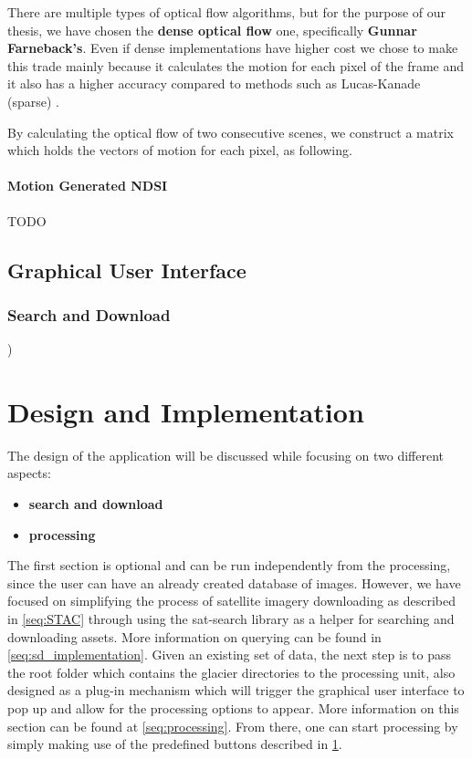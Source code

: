 \documentclass[11pt, a4paper]{report}
\begin{document}
	There are multiple types of optical flow algorithms, but for the purpose of our thesis, we have chosen the \textbf{dense optical flow} one, specifically \textbf{Gunnar Farneback's}. Even if dense implementations have higher cost we chose to make this trade mainly because it calculates the motion for each pixel of the frame and it also has a higher accuracy \cite{orb} compared to methods such as Lucas-Kanade (sparse) \cite{lukas}.
	
	By calculating the optical flow of two consecutive scenes, we construct a matrix which holds the vectors of motion for each pixel, as following.

	\subsubsection{Motion Generated NDSI}
	\label{seq:motion_generated_gui}
	TODO
	\section{Graphical User Interface}
	\label{seq:gui}
	\subsection{Search and Download}
	\label{seq:search_download})

	\chapter{Design and Implementation}
	\label{cha:design_and_implementation}
	
	The design of the application will be discussed while focusing on two different aspects:
	\begin{itemize}
		\item \textbf{search and download}
		\item \textbf{processing}
	\end{itemize}
	The first section is optional and can be run independently from the processing, since the user can have an already created database of images. However, we have focused on simplifying the process of satellite imagery downloading as described in \ref{seq:STAC} through using the sat-search library as a helper for searching and downloading assets. More information on querying can be found in \ref{seq:sd_implementation}. 
	Given an existing set of data, the next step is to pass the root folder which contains the glacier directories to the processing unit, also designed as a plug-in mechanism which will trigger the graphical user interface to pop up and allow for the processing options to appear. More information on this section can be found at \ref{seq:processing}. From there, one can start processing by simply making use of the predefined buttons described in \ref{seq:gui}.
	
\end{document}
